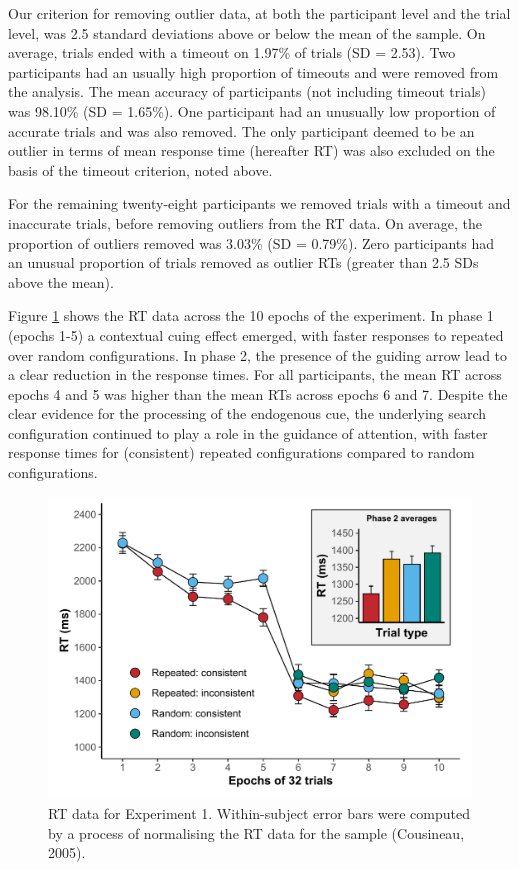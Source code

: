 \documentclass[
  man,floatsintext]{apa7}
\begin{document}
Our criterion for removing outlier data, at both the participant level and the trial level, was 2.5 standard deviations above or below the mean of the sample. On average, trials ended with a timeout on 1.97\% of trials (SD = 2.53). Two participants had an usually high proportion of timeouts and were removed from the analysis. The mean accuracy of participants (not including timeout trials) was 98.10\% (SD = 1.65\%). One participant had an unusually low proportion of accurate trials and was also removed. The only participant deemed to be an outlier in terms of mean response time (hereafter RT) was also excluded on the basis of the timeout criterion, noted above.

For the remaining twenty-eight participants we removed trials with a timeout and inaccurate trials, before removing outliers from the RT data. On average, the proportion of outliers removed was 3.03\% (SD = 0.79\%). Zero participants had an unusual proportion of trials removed as outlier RTs (greater than 2.5 SDs above the mean).



Figure \ref{fig:Exp1-RT-figure} shows the RT data across the 10 epochs of the experiment. In phase 1 (epochs 1-5) a contextual cuing effect emerged, with faster responses to repeated over random configurations. In phase 2, the presence of the guiding arrow lead to a clear reduction in the response times. For all participants, the mean RT across epochs 4 and 5 was higher than the mean RTs across epochs 6 and 7. Despite the clear evidence for the processing of the endogenous cue, the underlying search configuration continued to play a role in the guidance of attention, with faster response times for (consistent) repeated configurations compared to random configurations.

\begin{figure}

{\centering \includegraphics{CCC_ms1_files/figure-latex/Exp1-RT-figure-1} 

}

\caption{RT data for Experiment 1. Within-subject error bars were computed by a process of normalising the RT data for the sample (Cousineau, 2005).}\label{fig:Exp1-RT-figure}
\end{figure}
\end{document}
